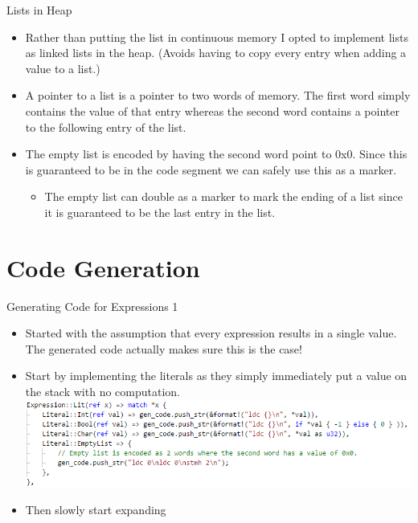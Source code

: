 \documentclass[10pt]{beamer}
\begin{document}
\begin{frame}{Lists in Heap}
    \begin{itemize}
        \item Rather than putting the list in continuous memory I opted to implement lists as linked lists in the heap. (Avoids having to copy every entry when adding a value to a list.)
        \item A pointer to a list is a pointer to two words of memory. The first word simply contains the value of that entry whereas the second word contains a pointer to the following entry of the list.
        \item The empty list is encoded by having the second word point to 0x0. Since this is guaranteed to be in the code segment we can safely use this as a marker.
        \begin{itemize}
            \item The empty list can double as a marker to mark the ending of a list since it is guaranteed to be the last entry in the list.
        \end{itemize}
    \end{itemize}
\end{frame}

\section{Code Generation}
\begin{frame}{Generating Code for Expressions 1}
    \begin{itemize}
        \item Started with the assumption that every expression results in a single value. The generated code actually makes sure this is the case!
        \item Start by implementing the literals as they simply immediately put a value on the stack with no computation.
        \includegraphics[width=\textwidth]{presentation3/3.png}
        \item Then slowly start expanding
    \end{itemize}
\end{frame}
\end{document}

